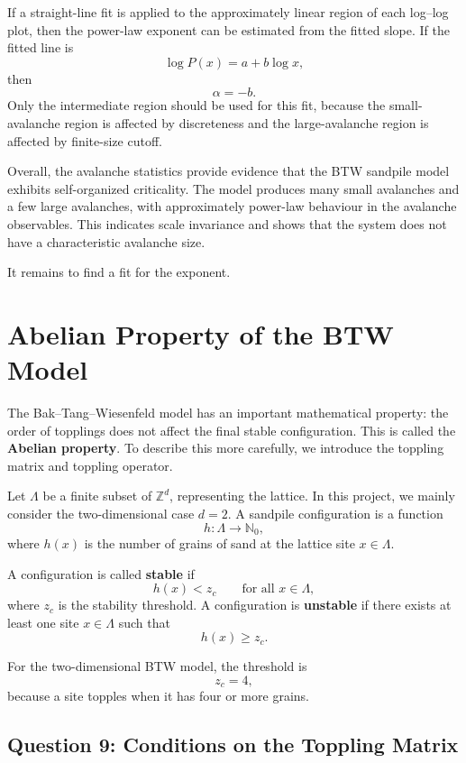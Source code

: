 If a straight-line fit is applied to the approximately linear region of each log--log plot, then
the power-law exponent can be estimated from the fitted slope. If the fitted line is
\[
\log P(x) = a + b \log x,
\]
then
\[
\alpha = -b.
\]
Only the intermediate region should be used for this fit, because the small-avalanche region
is affected by discreteness and the large-avalanche region is affected by finite-size cutoff.

Overall, the avalanche statistics provide evidence that the BTW sandpile model exhibits
self-organized criticality. The model produces many small avalanches and a few large
avalanches, with approximately power-law behaviour in the avalanche observables. This
indicates scale invariance and shows that the system does not have a characteristic
avalanche size.

It remains to find a fit for the exponent.

\section{Abelian Property of the BTW Model}
\label{sec:abelian_property}

The Bak--Tang--Wiesenfeld model has an important mathematical property: the order of
topplings does not affect the final stable configuration. This is called the \textbf{Abelian
property}. To describe this more carefully, we introduce the toppling matrix and toppling
operator.

Let \(\Lambda\) be a finite subset of \(\mathbb{Z}^d\), representing the lattice. In this project,
we mainly consider the two-dimensional case \(d=2\). A sandpile configuration is a function
\[
h : \Lambda \to \mathbb{N}_0,
\]
where \(h(x)\) is the number of grains of sand at the lattice site \(x \in \Lambda\).

A configuration is called \textbf{stable} if
\[
h(x) < z_c
\qquad
\text{for all } x \in \Lambda,
\]
where \(z_c\) is the stability threshold. A configuration is \textbf{unstable} if there exists at
least one site \(x \in \Lambda\) such that
\[
h(x) \geq z_c.
\]

For the two-dimensional BTW model, the threshold is
\[
z_c = 4,
\]
because a site topples when it has four or more grains.

\subsection{Question 9: Conditions on the Toppling Matrix}

